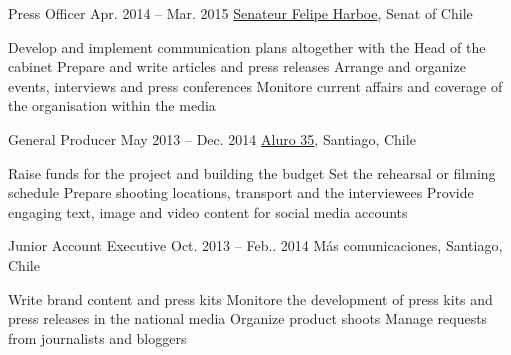 \begin{joblist}[13.2][7.8][3.4]
\item[Press Officer]{Apr. 2014 -- Mar. 2015}
     {
     \href{https://www.harboe.cl/}{Senateur Felipe Harboe}, Senat of Chile
     } 
	 {
	         \vspace{-0.5cm}
			\iftbftiny \setlength{\parskip}{-10pt} \fi
			\begin{itemize}
			  \iftbftiny \setlength\itemsep{-3pt} \fi
			  \cvitem[\checkmark] Develop and implement communication plans altogether with the Head of the cabinet
			  \cvitem[\checkmark] Prepare and write articles and press releases
			  \cvitem[\checkmark] Arrange and organize events, interviews and press conferences
			  \cvitem[\checkmark] Monitore current affairs and coverage of the organisation within the media
			\end{itemize}     
	}
    
        
\item[General Producer]{May 2013 -- Dec. 2014}
     {
     \href{https://www.aluro35.com/}{Aluro 35}, Santiago, Chile
     }
     {	
             \vspace{-0.5cm}
			\iftbftiny \setlength{\parskip}{-10pt} \fi
			\begin{itemize}
			  \iftbftiny \setlength\itemsep{-3pt} \fi
			  \cvitem[\checkmark] Raise funds for the project and building the budget
			  \cvitem[\checkmark] Set the rehearsal or filming schedule
			  \cvitem[\checkmark] Prepare shooting locations, transport and the interviewees 
			  \cvitem[\checkmark] Provide engaging text, image and video content for social media accounts
			\end{itemize}     
	}



\item[Junior Account Executive ]{Oct. 2013 -- Feb.. 2014 }     
  	{
  	Más comunicaciones, Santiago, Chile
  	}     
  	{
        \vspace{-0.5cm}
		\iftbftiny \setlength{\parskip}{-10pt} \fi
		\begin{itemize}
			  \iftbftiny \setlength\itemsep{-3pt} \fi
			  \cvitem[\checkmark] Write brand content and press kits
			  \cvitem[\checkmark] Monitore the development of press kits and press releases in the national media
			  \cvitem[\checkmark] Organize product shoots
			  \cvitem[\checkmark] Manage requests from journalists and bloggers
		\end{itemize}       
	}





\end{joblist}
